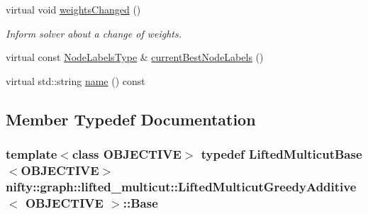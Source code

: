 \begin{DoxyCompactItemize}
virtual void \hyperlink{classnifty_1_1graph_1_1lifted__multicut_1_1LiftedMulticutGreedyAdditive_aedc059129bc6c5e7fae87049693e03e6}{weights\+Changed} ()
\begin{DoxyCompactList}\small\item\em Inform solver about a change of weights. \end{DoxyCompactList}\item 
virtual const \hyperlink{classnifty_1_1graph_1_1lifted__multicut_1_1LiftedMulticutGreedyAdditive_aeb295097f2ca8a7f9cf0770df94c17ab}{Node\+Labels\+Type} \& \hyperlink{classnifty_1_1graph_1_1lifted__multicut_1_1LiftedMulticutGreedyAdditive_a90842fb26c786cca721e714f8fe76299}{current\+Best\+Node\+Labels} ()
\item 
virtual std\+::string \hyperlink{classnifty_1_1graph_1_1lifted__multicut_1_1LiftedMulticutGreedyAdditive_aa288d8487af994a6e273a6a6925d2143}{name} () const 
\end{DoxyCompactItemize}


\subsection{Member Typedef Documentation}
\hypertarget{classnifty_1_1graph_1_1lifted__multicut_1_1LiftedMulticutGreedyAdditive_ad7da40c743c9fa684412df069ce30440}{}
\subsubsection[{Base}]{\setlength{\rightskip}{0pt plus 5cm}template$<$class O\+B\+J\+E\+C\+T\+I\+V\+E$>$ typedef {\bf Lifted\+Multicut\+Base}$<$O\+B\+J\+E\+C\+T\+I\+V\+E$>$ {\bf nifty\+::graph\+::lifted\+\_\+multicut\+::\+Lifted\+Multicut\+Greedy\+Additive}$<$ O\+B\+J\+E\+C\+T\+I\+V\+E $>$\+::{\bf Base}}\label{classnifty_1_1graph_1_1lifted__multicut_1_1LiftedMulticutGreedyAdditive_ad7da40c743c9fa684412df069ce30440}
\hypertarget{classnifty_1_1graph_1_1lifted__multicut_1_1LiftedMulticutGreedyAdditive_a0f298ccab4ca174bb91fd3026b473b5f}{}
